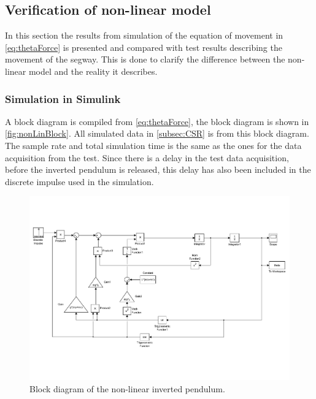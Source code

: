 \subsection{Verification of non-linear model}
In this section the results from simulation of the equation of movement in \autoref{eq:thetaForce} is presented and compared with test results describing the movement of the segway. This is done to clarify the difference between the non-linear model and the reality it describes.
\subsubsection{Simulation in Simulink}\label{subsec:SiS}
A block diagram is compiled from \autoref{eq:thetaForce}, the block diagram is shown in \autoref{fig:nonLinBlock}. All simulated data in \autoref{subsec:CSR} is from this block diagram.
The sample rate and total simulation time is the same as the ones for the data acquisition from the test. Since there is a delay in the test data acquisition, before the inverted pendulum is released, this delay has also been included in the discrete impulse used in the simulation.
\begin{figure}[H]
\includegraphics[width=\textwidth]{figures/BlockIPNL.pdf}
\caption{Block diagram of the non-linear inverted pendulum.\label{fig:nonLinBlock}}
\end{figure}






